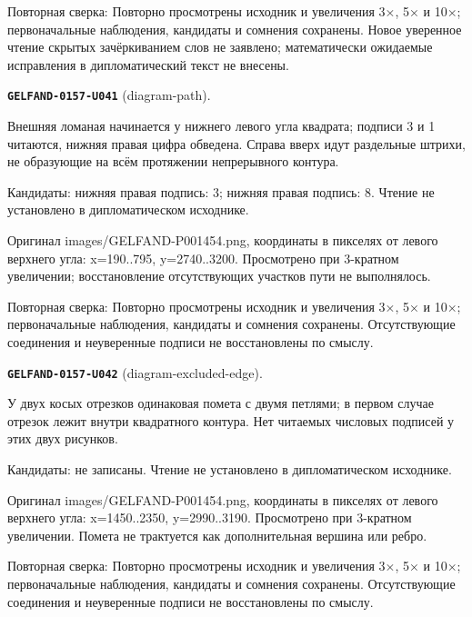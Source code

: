 Повторная сверка: Повторно просмотрены исходник и увеличения 3×, 5× и 10×; первоначальные наблюдения, кандидаты и сомнения сохранены. Новое уверенное чтение скрытых зачёркиванием слов не заявлено; математически ожидаемые исправления в дипломатический текст не внесены.\par\medskip
\par\noindent\leavevmode{}\label{GELFAND-0157-U041}\label{GELFAND-P001454:diagram-path}\textbf{\texttt{GELFAND-0157-U041}} (diagram-path).\nopagebreak[4]\par
Внешняя ломаная начинается у нижнего левого угла квадрата; подписи 3 и 1 читаются, нижняя правая цифра обведена. Справа вверх идут раздельные штрихи, не образующие на всём протяжении непрерывного контура.\par
Кандидаты: нижняя правая подпись: 3; нижняя правая подпись: 8. Чтение не установлено в дипломатическом исходнике.\par
Оригинал images/GELFAND-P001454.png, координаты в пикселях от левого верхнего угла: x=190..795, y=2740..3200. Просмотрено при 3-кратном увеличении; восстановление отсутствующих участков пути не выполнялось.\par
Повторная сверка: Повторно просмотрены исходник и увеличения 3×, 5× и 10×; первоначальные наблюдения, кандидаты и сомнения сохранены. Отсутствующие соединения и неуверенные подписи не восстановлены по смыслу.\par\medskip
\par\noindent\leavevmode{}\label{GELFAND-0157-U042}\label{GELFAND-P001454:diagram-excluded-edge}\textbf{\texttt{GELFAND-0157-U042}} (diagram-excluded-edge).\nopagebreak[4]\par
У двух косых отрезков одинаковая помета с двумя петлями; в первом случае отрезок лежит внутри квадратного контура. Нет читаемых числовых подписей у этих двух рисунков.\par
Кандидаты: не записаны. Чтение не установлено в дипломатическом исходнике.\par
Оригинал images/GELFAND-P001454.png, координаты в пикселях от левого верхнего угла: x=1450..2350, y=2990..3190. Просмотрено при 3-кратном увеличении. Помета не трактуется как дополнительная вершина или ребро.\par
Повторная сверка: Повторно просмотрены исходник и увеличения 3×, 5× и 10×; первоначальные наблюдения, кандидаты и сомнения сохранены. Отсутствующие соединения и неуверенные подписи не восстановлены по смыслу.\par\medskip

